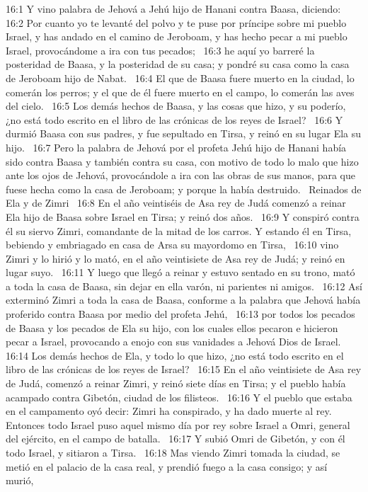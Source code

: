 16:1 Y vino palabra de Jehová a Jehú hijo de Hanani contra Baasa, diciendo:  
16:2 Por cuanto yo te levanté del polvo y te puse por príncipe sobre mi pueblo Israel, y has andado en el camino de Jeroboam, y has hecho pecar a mi pueblo Israel, provocándome a ira con tus pecados;  
16:3 he aquí yo barreré la posteridad de Baasa, y la posteridad de su casa; y pondré su casa como la casa de Jeroboam hijo de Nabat.  
16:4 El que de Baasa fuere muerto en la ciudad, lo comerán los perros; y el que de él fuere muerto en el campo, lo comerán las aves del cielo.  
16:5 Los demás hechos de Baasa, y las cosas que hizo, y su poderío, ¿no está todo escrito en el libro de las crónicas de los reyes de Israel?  
16:6 Y durmió Baasa con sus padres, y fue sepultado en Tirsa, y reinó en su lugar Ela su hijo.  
16:7 Pero la palabra de Jehová por el profeta Jehú hijo de Hanani había sido contra Baasa y también contra su casa, con motivo de todo lo malo que hizo ante los ojos de Jehová, provocándole a ira con las obras de sus manos, para que fuese hecha como la casa de Jeroboam; y porque la había destruido.  
Reinados de Ela y de Zimri  
16:8 En el año veintiséis de Asa rey de Judá comenzó a reinar Ela hijo de Baasa sobre Israel en Tirsa; y reinó dos años.  
16:9 Y conspiró contra él su siervo Zimri, comandante de la mitad de los carros. Y estando él en Tirsa, bebiendo y embriagado en casa de Arsa su mayordomo en Tirsa,  
16:10 vino Zimri y lo hirió y lo mató, en el año veintisiete de Asa rey de Judá; y reinó en lugar suyo.  
16:11 Y luego que llegó a reinar y estuvo sentado en su trono, mató a toda la casa de Baasa, sin dejar en ella varón, ni parientes ni amigos.  
16:12 Así exterminó Zimri a toda la casa de Baasa, conforme a la palabra que Jehová había proferido contra Baasa por medio del profeta Jehú,  
16:13 por todos los pecados de Baasa y los pecados de Ela su hijo, con los cuales ellos pecaron e hicieron pecar a Israel, provocando a enojo con sus vanidades a Jehová Dios de Israel.  
16:14 Los demás hechos de Ela, y todo lo que hizo, ¿no está todo escrito en el libro de las crónicas de los reyes de Israel?  
16:15 En el año veintisiete de Asa rey de Judá, comenzó a reinar Zimri, y reinó siete días en Tirsa; y el pueblo había acampado contra Gibetón, ciudad de los filisteos.  
16:16 Y el pueblo que estaba en el campamento oyó decir: Zimri ha conspirado, y ha dado muerte al rey. Entonces todo Israel puso aquel mismo día por rey sobre Israel a Omri, general del ejército, en el campo de batalla.  
16:17 Y subió Omri de Gibetón, y con él todo Israel, y sitiaron a Tirsa.  
16:18 Mas viendo Zimri tomada la ciudad, se metió en el palacio de la casa real, y prendió fuego a la casa consigo; y así murió,  
